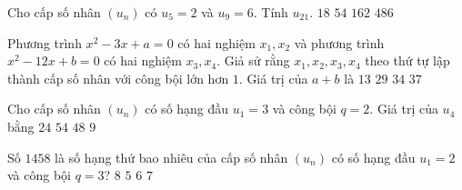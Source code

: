 \begin{ex}%
	Cho cấp số nhân $(u_n)$ có $u_5 =2$ và $u_9=6$. Tính $u_{21}$.
	\choice
	{$18$}
	{$54$}
	{\True $162$}
	{$486$}
\end{ex}%
\begin{ex}%
	Phương trình $ x^2 - 3x + a = 0 $ có hai nghiệm $ x_1, x_2 $ và phương trình $ x^2 - 12x + b = 0 $ có hai nghiệm $ x_3, x_4 $. Giả sử rằng $ x_1, x_2, x_3, x_4 $  theo thứ tự lập thành cấp số nhân với công bội lớn hơn $ 1 $. Giá trị của $ a + b $ là
	\choice
	{$ 13 $}
	{$ 29 $}
	{\True $ 34 $}
	{$ 37 $}
\end{ex}%
\begin{ex}%
	Cho cấp số nhân $(u_n)$ có số hạng đầu $u_1=3$ và công bội $q=2$. Giá trị của $u_4$ bằng
	\choice
	{\True $24$}
	{$54$}
	{$48$}
	{$9$}
\end{ex}%
\begin{ex}%
Số $1458$ là số hạng thứ bao nhiêu của cấp số nhân $(u_n)$ có số hạng đầu $u_1=2$ và công bội $q=3$?
	\choice
	{$8$}
	{$5$}
	{$6$}
	{\True $7$}
\end{ex}%

